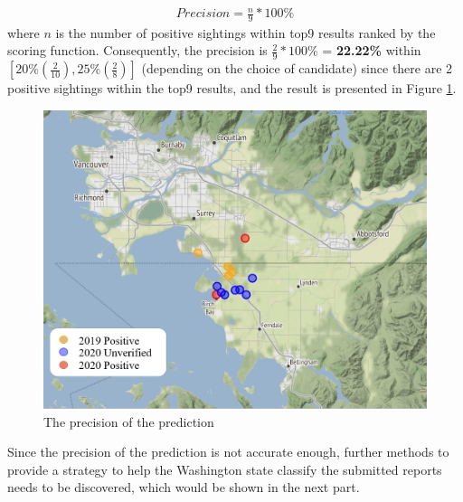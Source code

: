 \documentclass{mcmthesis}
\begin{document}
	\begin{align*}
		Precision = \frac{n}{9}*100\%
	\end{align*}
	where $n$ is the number of positive sightings within top9 results ranked by the scoring function. Consequently, the precision is $\frac{2}{9}*100\%$ = \textbf{22.22\%} within $[20\%(\frac{2}{10}),25\%(\frac{2}{8})]$ (depending on the choice of candidate) since there are 2 positive sightings within the top9 results, and the result is presented in Figure \ref{marked2}.
	\begin{figure}[H]
		\centering
		\includegraphics[scale=0.5]{marked2.png}
		\caption{The precision of the prediction}
		\label{marked2}
	\end{figure}
	
	Since the precision of the prediction is not accurate enough, further methods to provide a strategy to help the Washington state classify the submitted reports needs to be discovered, which would be shown in the next part.
	
\end{document}
